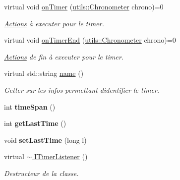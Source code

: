 \begin{DoxyCompactItemize}
\item 
\mbox{\label{classITimerListener_a0d974556acf49d43add83ffabb25abe8}} 
virtual void \hyperlink{classITimerListener_a0d974556acf49d43add83ffabb25abe8}{on\+Timer} (\hyperlink{classutils_1_1Chronometer}{utils\+::\+Chronometer} chrono)=0
\begin{DoxyCompactList}\small\item\em \hyperlink{classActions}{Actions} à executer pour le timer. \end{DoxyCompactList}\item 
\mbox{\label{classITimerListener_a0004b567b000eef6df12d9d970909142}} 
virtual void \hyperlink{classITimerListener_a0004b567b000eef6df12d9d970909142}{on\+Timer\+End} (\hyperlink{classutils_1_1Chronometer}{utils\+::\+Chronometer} chrono)=0
\begin{DoxyCompactList}\small\item\em \hyperlink{classActions}{Actions} de fin à executer pour le timer. \end{DoxyCompactList}\item 
\mbox{\label{classITimerListener_a1fb13795b7ae788210f5e6bce5a9aeb0}} 
virtual std\+::string \hyperlink{classITimerListener_a1fb13795b7ae788210f5e6bce5a9aeb0}{name} ()
\begin{DoxyCompactList}\small\item\em Getter sur les infos permettant d\textquotesingle{}identifier le timer. \end{DoxyCompactList}\item 
\mbox{\label{classITimerListener_a746c0ceee4eb354754d2e90c5638454c}} 
int {\bfseries time\+Span} ()
\item 
\mbox{\label{classITimerListener_afdef8ccebdbaf3102d64df87951def4c}} 
int {\bfseries get\+Last\+Time} ()
\item 
\mbox{\label{classITimerListener_a459eb8a49927fb50bef7965140a196b7}} 
void {\bfseries set\+Last\+Time} (long l)
\item 
\mbox{\label{classITimerListener_a5eb6e3cce242f255ee667c69c5d4041c}} 
virtual \hyperlink{classITimerListener_a5eb6e3cce242f255ee667c69c5d4041c}{$\sim$ I\+Timer\+Listener} ()
\begin{DoxyCompactList}\small\item\em Destructeur de la classe. \end{DoxyCompactList}\end{DoxyCompactItemize}

